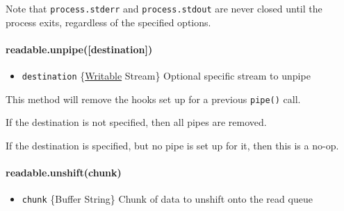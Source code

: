 Note that \texttt{process.stderr} and \texttt{process.stdout} are never
closed until the process exits, regardless of the specified options.

\paragraph{readable.unpipe({[}destination{]})}

\begin{itemize}
\item
  \texttt{destination}
  \{\hyperref[stream\_class\_stream\_writable]{Writable} Stream\}
  Optional specific stream to unpipe
\end{itemize}

This method will remove the hooks set up for a previous \texttt{pipe()}
call.

If the destination is not specified, then all pipes are removed.

If the destination is specified, but no pipe is set up for it, then this
is a no-op.

\begin{Shaded}
\begin{Highlighting}[]
 
 \NormalTok{(}\NormalTok{);}
\NormalTok{() \{}
  \NormalTok{(}\NormalTok{);}
  \NormalTok{(}\NormalTok{);}
  \NormalTok{();}
\NormalTok{\}, }\NormalTok{);}
\end{Highlighting}
\end{Shaded}

\paragraph{readable.unshift(chunk)}

\begin{itemize}
\item
  \texttt{chunk} \{Buffer \textbar{} String\} Chunk of data to unshift
  onto the read queue
\end{itemize}

